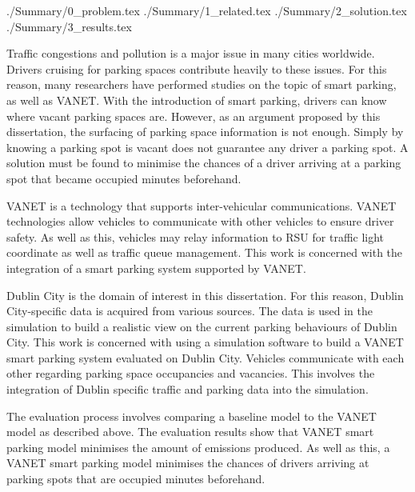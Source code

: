 \documentclass[a4paper, 11pt, oneside]{report}
\begin{document}
\thesistitlepage
\thesisdeclarationpage

\begin{thesissummary}
{./Summary/0_problem.tex}
{./Summary/1_related.tex}
{./Summary/2_solution.tex}
{./Summary/3_results.tex}
\end{thesissummary}

\begin{thesisabstract}
    Traffic congestions and pollution is a major issue in many cities worldwide. Drivers cruising for parking spaces contribute heavily to these issues. For this reason, many researchers have performed studies on the topic of smart parking, as well as \ac{VANET}. With the introduction of smart parking, drivers can know where vacant parking spaces are. However, as an argument proposed by this dissertation, the surfacing of parking space information is not enough. Simply by knowing a parking spot is vacant does not guarantee any driver a parking spot. A solution must be found to minimise the chances of a driver arriving at a parking spot that became occupied minutes beforehand.
    
    \ac{VANET} is a technology that supports inter-vehicular communications. \ac{VANET} technologies allow vehicles to communicate with other vehicles to ensure driver safety. As well as this, vehicles may relay information to \ac{RSU} for traffic light coordinate as well as traffic queue management. This work is concerned with the integration of a smart parking system supported by \ac{VANET}.
    
    Dublin City is the domain of interest in this dissertation. For this reason, Dublin City-specific data is acquired from various sources. The data is used in the simulation to build a realistic view on the current parking behaviours of Dublin City. This work is concerned with using a simulation software to build a \ac{VANET} smart parking system evaluated on Dublin City. Vehicles communicate with each other regarding parking space occupancies and vacancies. This involves the integration of Dublin specific traffic and parking data into the simulation.
    
    The evaluation process involves comparing a baseline model to the \ac{VANET} model as described above. The evaluation results show that \ac{VANET} smart parking model minimises the amount of emissions produced. As well as this, a \ac{VANET} smart parking model minimises the chances of drivers arriving at parking spots that are occupied minutes beforehand.
\end{thesisabstract}
\end{document}
